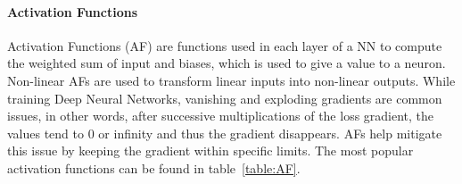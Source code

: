 \documentclass[conference]{IEEEtran}
\begin{document}
\paragraph{Activation Functions}

Activation Functions (AF) are functions used in each layer of a NN
to compute the weighted sum of input and biases, which is used to give a value
to a neuron. Non-linear AFs are used to transform linear inputs into non-linear
outputs.  While training Deep Neural Networks, vanishing and exploding
gradients are common issues, in other words, after successive multiplications
of the loss gradient, the values tend to 0 or infinity and thus the
gradient disappears. AFs help mitigate this issue by keeping the gradient within
specific limits. The most popular activation functions can be found in
table~\ref{table:AF}.

\end{document}
